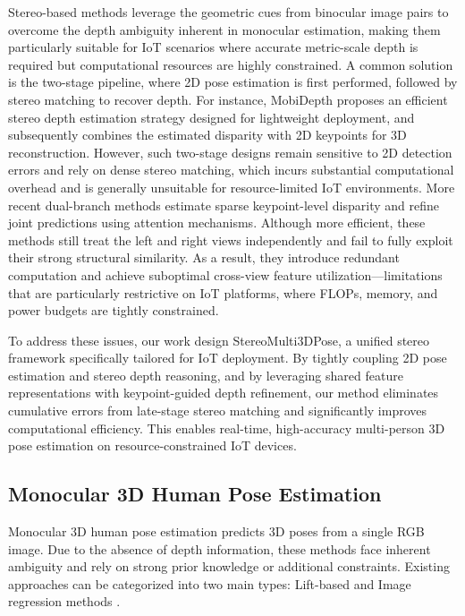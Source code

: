\documentclass[journal]{IEEEtran}
\begin{document}
Stereo-based methods leverage the geometric cues from binocular image pairs to overcome the depth ambiguity inherent in monocular estimation, making them particularly suitable for IoT scenarios where accurate metric-scale depth is required but computational resources are highly constrained. A common solution is the two-stage pipeline, where 2D pose estimation is first performed, followed by stereo matching to recover depth. For instance, MobiDepth  proposes an efficient stereo depth estimation strategy designed for lightweight deployment, and subsequently combines the estimated disparity with 2D keypoints for 3D reconstruction. However, such two-stage designs remain sensitive to 2D detection errors and rely on dense stereo matching, which incurs substantial computational overhead and is generally unsuitable for resource-limited IoT environments. More recent dual-branch methods  estimate sparse keypoint-level disparity and refine joint predictions using attention mechanisms. Although more efficient, these methods still treat the left and right views independently and fail to fully exploit their strong structural similarity. As a result, they introduce redundant computation and achieve suboptimal cross-view feature utilization—limitations that are particularly restrictive on IoT platforms, where FLOPs, memory, and power budgets are tightly constrained.

To address these issues, our work design StereoMulti3DPose, a unified stereo framework specifically tailored for IoT deployment. By tightly coupling 2D pose estimation and stereo depth reasoning, and by leveraging shared feature representations with keypoint-guided depth refinement, our method eliminates cumulative errors from late-stage stereo matching and significantly improves computational efficiency. This enables real-time, high-accuracy multi-person 3D pose estimation on resource-constrained IoT devices.

\subsection{Monocular 3D Human Pose Estimation}

Monocular 3D human pose estimation predicts 3D poses from a single RGB image. Due to the absence of depth information, these methods face inherent ambiguity and rely on strong prior knowledge or additional constraints. Existing approaches can be categorized into two main types: Lift-based  and Image regression methods .
\end{document}

